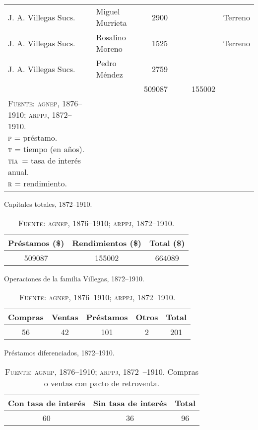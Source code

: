 \documentclass[14pt,twoside,final]{extbook} %
\begin{document}
{\begin{longtable}[c]{@{}p{2.5cm}lrSrrl@{}}
J. A. Villegas Sucs. & Miguel Murrieta & 2900 & {} & {} & {} & Terreno \\
J. A. Villegas Sucs. & Rosalino Moreno & 1525 & {} & {} & {} & Terreno \\
J. A. Villegas Sucs. & Pedro Méndez & 2759 & {} & {} & {} & {} \\
\midrule
{} & {} & 509087 & {} & {} & 155002 & {} \\
\bottomrule
\caption*{\textsc{Fuente:} \textsc{agnep}, 1876--1910; \textsc{arppj}, 1872--1910. \\  \textsc{p} = préstamo. \\  \textsc{t} = tiempo (en años). \\  \textsc{tia}~= tasa de interés anual. \\  \textsc{r} = rendimiento.}
\label{tab:prestamos-y-rendimientos}
\end{longtable}
}%
\begin{table}[H]
\centering
\caption[Capitales totales, 1872--1910]{Capitales totales, 1872--1910.}
\tlfstyle
\begin{tabular}{@{}ccc@{}}
\toprule
Préstamos (\$) & Rendimientos (\$) & Total (\$) \\
\midrule
509087 & 155002 & 664089 \\
\bottomrule
\end{tabular}
\caption*{\textsc{Fuente:} \textsc{agnep}, 1876--1910; \textsc{arppj}, 1872--1910.}
\label{tab:capitales-totales}
\end{table}
\begin{table}[H]
\centering
\caption[Operaciones de la familia Villegas, 1872--1910]{Operaciones de la familia Villegas, 1872--1910.}
\tlfstyle
\begin{tabular}{@{}ccccc@{}}
\toprule
Compras & Ventas & Préstamos & Otros & Total \\
\midrule
56 & 42 & 101 & 2 & 201 \\
\bottomrule
\end{tabular}
\caption*{\textsc{Fuente:} \textsc{agnep}, 1876--1910; \textsc{arppj}, 1872--1910.}
\label{tab:operaciones-fam-villegas}
\end{table}
\begin{table}[H]
\centering
\caption[Préstamos diferenciados, 1872--1910]{Préstamos diferenciados, 1872--1910.}
\tlfstyle
\begin{tabular}{@{}ccc@{}}
\toprule
Con tasa de interés & Sin tasa de interés\textsu{*} & Total \\
\midrule
60 & 36 & 96 \\
\bottomrule
\end{tabular}
\caption*{\textsc{Fuente:} \textsc{agnep}, 1876--1910; \textsc{arppj}, 1872~--1910. \textsu{*} Compras o ventas con pacto de retroventa.}
\label{tab:prestamos-diferenciados}
\end{table}
\end{document}
